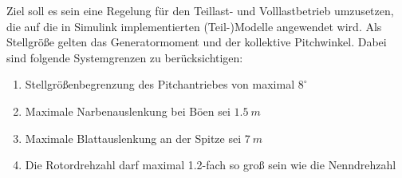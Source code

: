 Ziel soll es sein eine Regelung für den Teillast- und Volllastbetrieb umzusetzen, die auf die in Simulink implementierten (Teil-)Modelle angewendet wird. Als Stellgröße gelten das Generatormoment und der kollektive Pitchwinkel. Dabei sind folgende Systemgrenzen zu berücksichtigen:

\begin{enumerate}
    \item Stellgrößenbegrenzung des Pitchantriebes von maximal $8^\circ$
    \item Maximale Narbenauslenkung bei Böen sei $\SI{1.5}{m}$
    \item Maximale Blattauslenkung an der Spitze sei $\SI{7}{m}$
    \item Die Rotordrehzahl darf maximal 1.2-fach so groß sein wie die Nenndrehzahl
\end{enumerate}